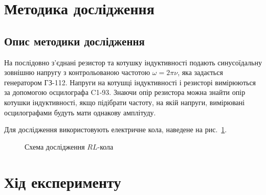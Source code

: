 \section{Методика дослідження}

\subsection{Опис методики дослідження}

На послідовно з'єднані резистор та котушку індуктивності подають синусоїдальну зовнішню напругу з контрольованою частотою $\omega = 2\pi \nu$, яка задається генератором ГЗ-112. Напруги на котушці індуктивності і резисторі вимірюються за допомогою  осцилографа C1-93. Знаючи опір резистора можна знайти опір котушки індуктивності, якщо підібрати частоту, на якій напруги, вимірювані осцилографами будуть мати однакову амплітуду.

Для дослідження використовують електричне кола, наведене на рис.~\ref{pic:RL_circuit}.

\begin{figure}[h!]\centering
        
		\caption{Схема дослідження $RL$-кола}
		\label{pic:RL_circuit}
\end{figure}


\section{Хід експерименту}

